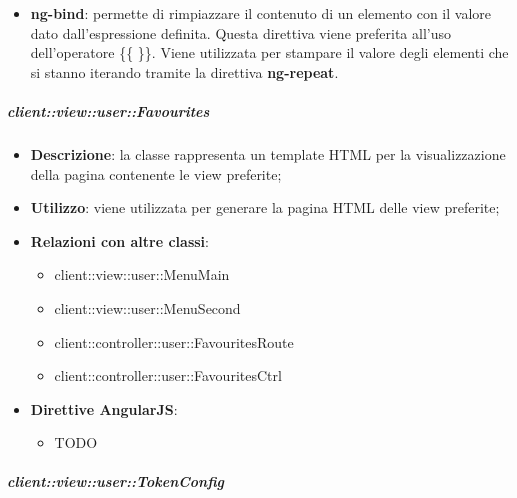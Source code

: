 \begin{itemize}
\begin{itemize}
						\item \textbf{ng-bind}: permette di rimpiazzare il contenuto di un elemento con il valore dato dall'espressione definita. Questa direttiva viene preferita all'uso dell'operatore \{\{ \}\}. Viene utilizzata per stampare il valore degli elementi che si stanno iterando tramite la direttiva \textbf{ng-repeat}.
					\end{itemize}
			\end{itemize}

		\subparagraph{client::view::user::Favourites} %
		\label{subp:bdsm_app_client_view_user_favourites}

			\begin{itemize}
				\item \textbf{Descrizione}: la classe rappresenta un template HTML per la visualizzazione della pagina contenente le view preferite;
				\item \textbf{Utilizzo}: viene utilizzata per generare la pagina HTML delle view preferite;
				\item \textbf{Relazioni con altre classi}:
					\begin{itemize}
						\item client::view::user::MenuMain
						\item client::view::user::MenuSecond
						\item client::controller::user::FavouritesRoute
						\item client::controller::user::FavouritesCtrl
					\end{itemize}
				\item \textbf{Direttive AngularJS}:
					\begin{itemize}
						\item TODO
					\end{itemize}
			\end{itemize}

		\subparagraph{client::view::user::TokenConfig} %
		\label{subp:bdsm_app_client_view_user_tokenconfig}

